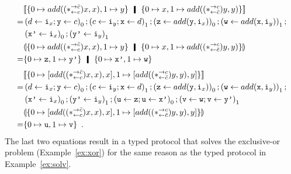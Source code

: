 \begin{example}
  \begin{align*}
&\llbracket
 {\{
  0\mapsto {add((\comodL)x,x)}, 1\mapsto {y}
  \}}
  \hmid
  {\{
  0\mapsto {x},
  1\mapsto {add((\comodR)y, y)}
  \}}
   \rrbracket\phantom{\hmid}\\
   =& \left(d\leftarrow \p i_x; \p y\leftarrow c\right)_0;
 \left(c\leftarrow \p i_y; \p x\leftarrow d\right)_1;
 \left(\p z\leftarrow add(\p y,\p i_x)\right)_0;
 \left(\p w\leftarrow add(\p x,\p i_y)\right)_1; \\
   & \left(\p{x'}\leftarrow \p i_x\right)_0;
     \left(\p{y'}\leftarrow \p i_y\right)_1 \\
&\llparenthesis
 {\{
  0\mapsto {add((\comodL)x,x)}, 1\mapsto {y}
  \}}
  \hmid
  {\{
  0\mapsto {x},
  1\mapsto {add((\comodR)y, y)}
  \}}
  \rrparenthesis\phantom{\hmid}\\
   =&
   \{0\mapsto \p z, 1\mapsto \p{y'}\} \hmid \{0\mapsto\p{x'}, 1\mapsto
   \p w\}
  \end{align*}
  \begin{align*}
   &\llbracket{
   \{
   0\mapsto [{{add((\ast^{\rightarrow {\bar{c}}}_{\leftarrow{c}})x,x)},x}],
   1\mapsto [{{add((\ast^{\rightarrow {c}}_{\leftarrow{\bar{c}}})y,y)},y}]
   \}}\rrbracket
   \\
   =&\left(d\leftarrow \texttt{i}_x; \texttt{y}\leftarrow c\right)_0;
   \left(c\leftarrow \texttt{i}_y; \texttt{x}\leftarrow d\right)_1;
   \left(\texttt{z}\leftarrow add(\texttt{y},\texttt{i}_x)\right)_0;
   \left(\texttt{w}\leftarrow add(\texttt{x},\texttt{i}_y)\right)_1; \\
   & \left(\texttt{x'}\leftarrow \texttt{i}_x\right)_0;
     \left(\texttt{y'}\leftarrow \texttt{i}_y\right)_1;
   \left(\texttt{u} \leftarrow \texttt{z}; \texttt{u} \leftarrow \texttt{x'}\right)_0 ;
   \left(\texttt{v}\leftarrow \texttt{w}; \texttt{v} \leftarrow \texttt{y'}\right)_1
   \\
   &\llparenthesis{
   \{
   0\mapsto [{{add((\ast^{\rightarrow {\bar{c}}}_{\leftarrow{c}})x,x)},x}],
   1\mapsto [{{add((\ast^{\rightarrow {c}}_{\leftarrow{\bar{c}}})y,y)},y}]
   \}}\rrparenthesis
   \\
   =&\{0\mapsto\texttt{u},1\mapsto \texttt{v}\}\enspace.
  \end{align*}
  The last two equations result in a typed protocol that solves the
  exclusive-or problem (Example~\ref{ex:xor}) for the same reason as the
  typed protocol in Example~\ref{ex:solv}.
 \end{example}

